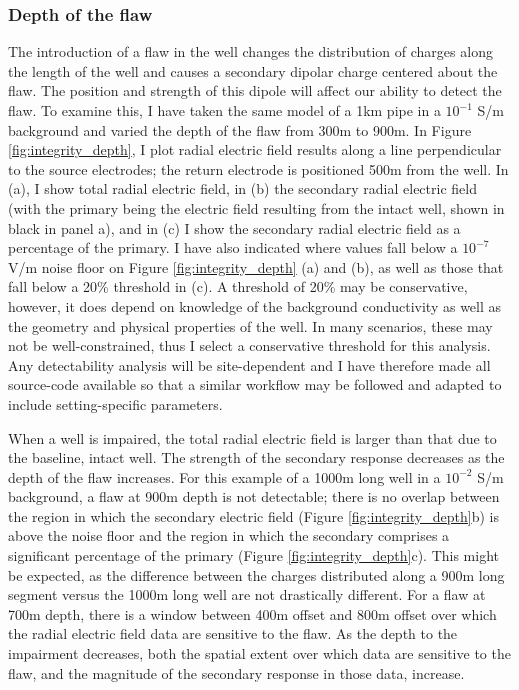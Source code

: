 \subsubsection{Depth of the flaw}
The introduction of a flaw in the well changes the distribution of charges along the length of the well and causes a secondary dipolar charge centered about the flaw. The position and strength of this dipole will affect our ability to detect the flaw. To examine this, I have taken the same model of a 1km pipe in a $10^{-1}$ S/m background and varied the depth of the flaw from 300m to 900m. In Figure \ref{fig:integrity_depth}, I plot radial electric field results along a line perpendicular to the source electrodes; the return electrode is positioned 500m from the well. In (a), I show total radial electric field, in (b) the secondary radial electric field (with the primary being the electric field resulting from the intact well, shown in black in panel a), and in (c) I show the secondary radial electric field as a percentage of the primary. I have also indicated where values fall below a $10^{-7}$ V/m noise floor on Figure \ref{fig:integrity_depth} (a) and (b), as well as those that fall below a 20\% threshold in (c). A threshold of 20\% may be conservative, however, it does depend on knowledge of the background conductivity as well as the geometry and physical properties of the well. In many scenarios, these may not be well-constrained, thus I select a conservative threshold for this analysis. Any detectability analysis will be site-dependent and I have therefore made all source-code available so that a similar workflow may be followed and adapted to include setting-specific parameters.

When a well is impaired, the total radial electric field is larger than that due to the baseline, intact well. The strength of the secondary response decreases as the depth of the flaw increases. For this example of a 1000m long well in a $10^{-2}$ S/m background, a flaw at 900m depth is not detectable; there is no overlap between the region in which the secondary electric field (Figure \ref{fig:integrity_depth}b) is above the noise floor and the region in which the secondary comprises a significant percentage of the primary (Figure \ref{fig:integrity_depth}c). This might be expected, as the difference between the charges distributed along a 900m long segment versus the 1000m long well are not drastically different. For a flaw at 700m depth, there is a window between 400m offset and 800m offset over which the radial electric field data are sensitive to the flaw. As the depth to the impairment decreases, both the spatial extent over which data are sensitive to the flaw, and the magnitude of the secondary response in those data, increase.




